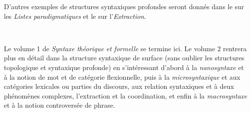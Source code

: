 D’autres exemples de structures syntaxiques profondes seront donnés dans le  sur les \textit{Listes paradigmatiques} et le  sur l’\textit{Extraction}.

\ 

Le volume 1  de \textit{Syntaxe théorique et formelle} se termine ici. Le volume 2 rentrera plus en détail dans la structure syntaxique de surface (sans oublier les structures topologique et syntaxique profonde) en s’intéressant d’abord à la \textit{nanosyntaxe} et à la notion de mot et de catégorie flexionnelle, puis à la \textit{microsyntaxique} et aux catégories lexicales ou parties du discours, aux relation syntaxiques et à deux phénomènes complexes, l’extraction et la coordination, et enfin à la \textit{macrosyntaxe} et à la notion controversée de phrase.



